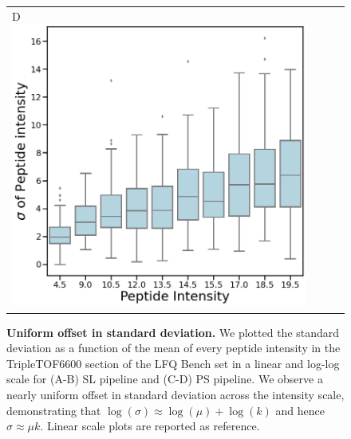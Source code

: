 \documentclass[11pt]{article}
\begin{document}
\begin{figure}[hbt]
\begin{tabular}{lclc}
        D \includegraphics[width=0.5\linewidth]{../../result/mu_sigma_variance_plots/diann/diann_boxplot_nolog_qvalFiltered_pepFiltered_qbinned.png} & \\%
    \end{tabular}
  \caption{{\bf Uniform offset in standard deviation.} We plotted the standard deviation as a function of the mean of every peptide intensity in the TripleTOF6600 section of the LFQ Bench set  in a linear and log-log scale for (A-B) SL pipeline and (C-D) PS pipeline.  We observe a nearly uniform offset in standard deviation across the intensity scale, demonstrating that $\log(\sigma) \approx \log(\mu) + \log(k)$ and hence   $\sigma \approx \mu k$. Linear scale plots are reported as reference.  \label{fig:uniform_offset_in_standard_deviation_boxplot}}
\end{figure}
\end{document}
